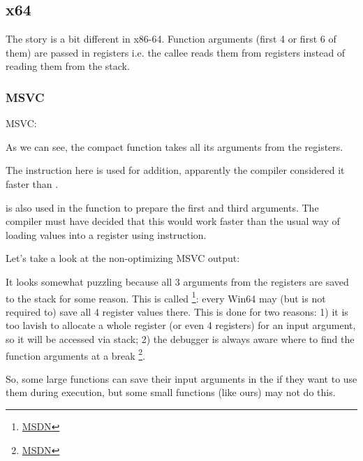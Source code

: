 \subsection{x64}


The story is a bit different in x86-64. Function arguments (first 4 or first 6 of them) 
are passed in registers i.e. the \gls{callee} reads them from registers instead of reading them from the stack.

\subsubsection{MSVC}

\Optimizing MSVC:



As we can see, the compact function \ttf takes all its arguments from the registers.

The \LEA instruction here is used for addition,
apparently the compiler considered it faster than .

\LEA is also used in the \main function to prepare the first and third \ttf arguments. The compiler
must have decided that this would work faster than the usual way of loading values into a register using \MOV instruction.

Let's take a look at the non-optimizing MSVC output:



It looks somewhat puzzling because all 3 arguments from the registers are saved to the stack for some reason.
\label{shadow_space}
This is called 
\footnote{\href{http://go.yurichev.com/17256}{MSDN}}: 
every Win64 may (but is not required to) save all 4 register values there.
This is done for two reasons: 
1) it is too lavish to allocate a whole register (or even 4 registers) for an input argument,
so it will be accessed via stack;
2) the debugger is always aware where to find the function arguments at a break
\footnote{\href{http://go.yurichev.com/17257}{MSDN}}.

So, some large functions can save their input arguments in the  if they want to use them
during execution, but some small functions (like ours) may not do this.

